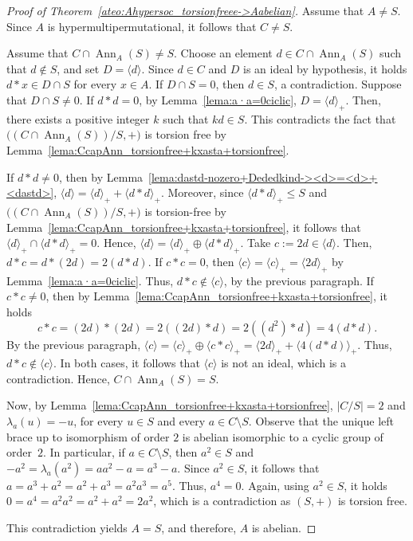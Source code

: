 \documentclass[12pt, a4paper, english]{article}
\theoremstyle{definition}
\DeclareMathOperator{\Ann}{Ann}
\begin{document}
\begin{proof}[Proof of Theorem~\ref{ateo:Ahypersoc_torsionfreee->Aabelian}]
Assume that $A \neq S$. Since $A$ is hypermultipermutational, it follows that $C\neq S$.

Assume that $C \cap \Ann_A(S) \neq S$. Choose an element $d \in C \cap \Ann_A(S)$ such that $d \notin S$, and set $D = \langle d \rangle$. Since $d \in C$ and $D$ is an ideal by hypothesis, it holds $d\ast x \in D \cap S$ for every $x \in A$. If $D \cap S = 0$, then $d \in S$, a contradiction. Suppose that $D\cap S \neq 0$. If $d \ast d  = 0$, by Lemma~\ref{lema:a·a=0ciclic}, $D = \langle d \rangle_+$. Then, there exists a positive integer $k$ such that $kd \in S$. This contradicts the fact that $\big((C \cap \Ann_A(S))/S,+\big)$ is torsion free by Lemma~\ref{lema:CcapAnn_torsionfree+kxasta+torsionfree}. 

If $d \ast d \neq 0$, then by Lemma~\ref{lema:dastd-nozero+Dededkind-><d>=<d>+<dastd>}, $\langle d \rangle = \langle d \rangle_+ + \langle d \ast d \rangle_+$. Moreover, since $\langle d \ast d \rangle_+ \leq S$ and $\big((C\cap \Ann_A(S))/S,+\big)$ is torsion-free by Lemma~\ref{lema:CcapAnn_torsionfree+kxasta+torsionfree}, it follows that $\langle d \rangle_+ \cap \langle d \ast d \rangle_+ = 0$. Hence, $\langle d \rangle = \langle d \rangle_+ \oplus \langle d \ast d \rangle_+$. Take $c := 2d \in \langle d \rangle$. Then, $d \ast c = d \ast (2d) = 2(d \ast d)$. If $c \ast c = 0$, then $\langle c \rangle = \langle c\rangle_+ = \langle 2d\rangle_+$ by Lemma~\ref{lema:a·a=0ciclic}. Thus, $d \ast c\notin \langle c\rangle$, by the previous paragraph. If $c \ast c \neq 0$, then by Lemma~\ref{lema:CcapAnn_torsionfree+kxasta+torsionfree}, it holds
\[ c\ast c = (2d) \ast (2d) = 2((2d) \ast d) = 2((d^2) \ast d) = 4(d\ast d).\]
By the previous paragraph, $\langle c \rangle = \langle c \rangle_+\oplus \langle c\ast c \rangle_+ = \langle 2d\rangle_+ + \langle 4(d\ast d)\rangle_+$. Thus, $d\ast c \notin \langle c \rangle$. In both cases, it follows that $\langle c \rangle$ is not an ideal, which is a contradiction. Hence, $C\cap \Ann_A(S) = S$. 

Now, by Lemma~\ref{lema:CcapAnn_torsionfree+kxasta+torsionfree}, $|C/S| = 2$ and $\lambda_a(u) = -u$, for every  $u\in S$ and every $a\in C\setminus S$. Observe that the unique left brace up to isomorphism of order $2$ is abelian isomorphic to a cyclic group of order~$2$. In particular, if $a \in C \setminus S$, then $a^2 \in S$ and  $-a^2 = \lambda_a(a^2) = aa^2 - a = a^3 - a$.  Since $a^2 \in S$, it follows that $a = a^3 + a^2 = a^2 + a^3 = a^2a^3 = a^5$. Thus,  $a^4 = 0$. Again, using $a^2 \in S$, it holds $0 = a^4 = a^2a^2 = a^2 + a^2 = 2a^2$, which is a contradiction as $(S,+)$ is torsion free. 

This contradiction yields $A = S$, and therefore, $A$ is abelian.
\end{proof}
\end{document}
